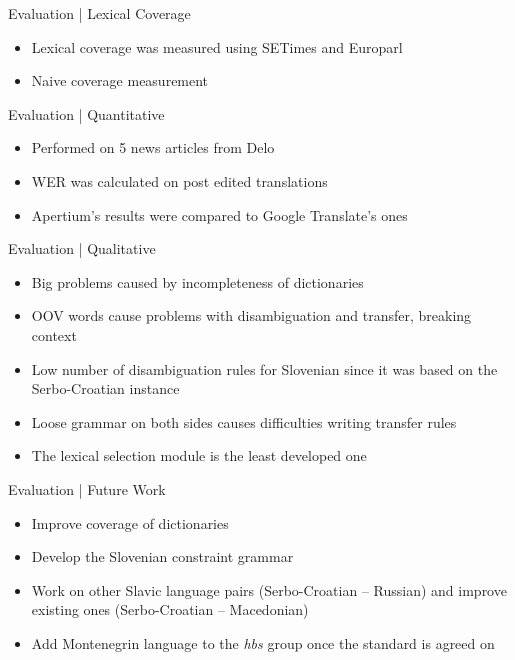 \documentclass{beamer}
\begin{document}

\begin{frame}{Evaluation | Lexical Coverage}
\begin{itemize}
\item Lexical coverage was measured using SETimes and Europarl
\item Naive coverage measurement
\end{itemize}

\end{frame}


\begin{frame}{Evaluation | Quantitative }
\begin{itemize}
\item Performed on 5 news articles from Delo
\item WER was calculated on post edited translations
\item Apertium's results were compared to Google Translate's ones
\end{itemize}

\end{frame}


\begin{frame}{Evaluation | Qualitative }
\begin{itemize}
\item Big problems caused by incompleteness of dictionaries
\item OOV words cause problems with disambiguation and transfer, breaking context
\item Low number of disambiguation rules for Slovenian since it was based on the Serbo-Croatian instance
\item Loose grammar on both sides causes difficulties writing transfer rules
\item The lexical selection module is the least developed one
\end{itemize}
\end{frame}


\begin{frame}{Evaluation | Future Work }
\begin{itemize}
\item Improve coverage of dictionaries
\item Develop the Slovenian constraint grammar
\item Work on other Slavic language pairs (Serbo-Croatian -- Russian) and improve existing ones (Serbo-Croatian -- Macedonian)
\item Add Montenegrin language to the \emph{hbs} group once the standard is agreed on

\end{itemize}
\end{frame}
\end{document}
